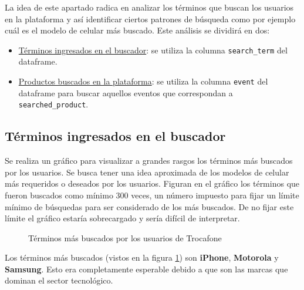 \documentclass[a4paper]{article}
\begin{document}
La idea de este apartado radica en analizar los términos que buscan los usuarios en la plataforma y así identificar ciertos patrones de búsqueda como por ejemplo cuál es el modelo de celular más buscado. Este análisis se dividirá en dos:

\begin{itemize}
	\item \underline{Términos ingresados en el buscador}: se utiliza la columna \texttt{search\_term} del dataframe.
	\item \underline{Productos buscados en la plataforma}: se utiliza la columna \texttt{event} del dataframe para buscar aquellos eventos que correspondan a \texttt{searched\_product}.
 \end{itemize}

\subsection{Términos ingresados en el buscador}

Se realiza un gráfico para visualizar a grandes rasgos los términos más buscados por los usuarios. Se busca tener una idea aproximada de los modelos de celular más requeridos o deseados por los usuarios. Figuran en el gráfico los términos que fueron buscados como mínimo 300 veces, un número impuesto para fijar un límite mínimo de búsquedas para ser considerado de los más buscados. De no fijar este límite el gráfico estaría sobrecargado y sería difícil de interpretar.

\begin{figure}[h!]
	\caption{Términos más buscados por los usuarios de Trocafone}
	\label{fig:searchedterm}
\end{figure}

Los términos más buscados (vistos en la figura \ref{fig:searchedterm}) son \textbf{iPhone}, \textbf{Motorola} y \textbf{Samsung}. Esto era completamente esperable debido a que son las marcas que dominan el sector tecnológico.
\end{document}
